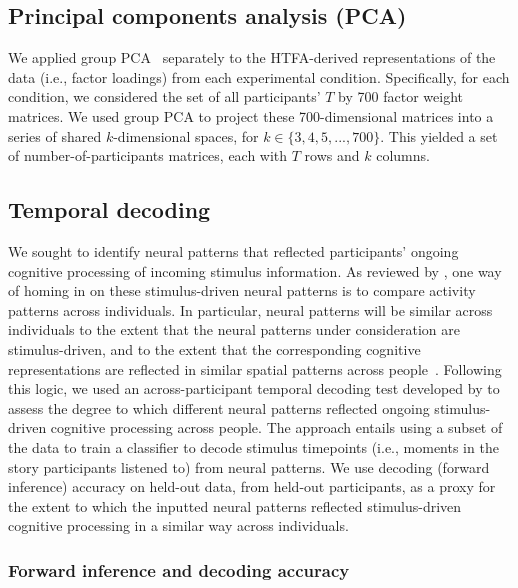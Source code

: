 \documentclass[english, 11pt]{article}
\begin{document}
\subsection*{Principal components analysis (PCA)}

We applied group PCA~\citep{SmitEtal14} separately to the HTFA-derived
representations of the data (i.e., factor loadings) from each experimental
condition. Specifically, for each condition, we considered the set of all
participants' $T$ by 700 factor weight matrices. We used group PCA to project
these 700-dimensional matrices into a series of shared $k$-dimensional spaces,
for $k \in \{3, 4, 5, ..., 700\}$. This yielded a set of number-of-participants
matrices, each with $T$ rows and $k$ columns.

\subsection*{Temporal decoding}

We sought to identify neural patterns that reflected participants' ongoing
cognitive processing of incoming stimulus information. As reviewed by
\cite{SimoEtal16}, one way of homing in on these stimulus-driven neural
patterns is to compare activity patterns across individuals. In particular,
neural patterns will be similar across individuals to the extent that the
neural patterns under consideration are stimulus-driven, and to the extent that
the corresponding cognitive representations are reflected in similar spatial
patterns across people~\citep{SimoChan20}. Following this logic, we used an
across-participant temporal decoding test developed by \cite{MannEtal18} to
assess the degree to which different neural patterns reflected ongoing
stimulus-driven cognitive processing across people. The approach entails using
a subset of the data to train a classifier to decode stimulus timepoints (i.e.,
moments in the story participants listened to) from neural patterns. We use
decoding (forward inference) accuracy on held-out data, from held-out
participants, as a proxy for the extent to which the inputted neural patterns
reflected stimulus-driven cognitive processing in a similar way across
individuals.

\subsubsection*{Forward inference and decoding accuracy}
\end{document}

